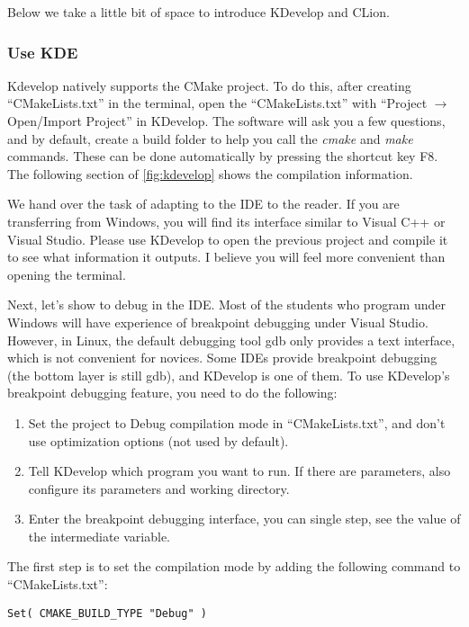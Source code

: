 Below we take a little bit of space to introduce KDevelop and CLion.

\subsubsection{Use KDE}
Kdevelop natively supports the CMake project. To do this, after creating ``CMakeLists.txt'' in the terminal, open the ``CMakeLists.txt'' with ``Project $\rightarrow$Open/Import Project'' in KDevelop. The software will ask you a few questions, and by default, create a build folder to help you call the \textit{cmake} and \textit{make} commands. These can be done automatically by pressing the shortcut key F8. The following section of \autoref{fig:kdevelop} shows the compilation information.

We hand over the task of adapting to the IDE to the reader. If you are transferring from Windows, you will find its interface similar to Visual C++ or Visual Studio. Please use KDevelop to open the previous project and compile it to see what information it outputs. I believe you will feel more convenient than opening the terminal.

Next, let's show to debug in the IDE. Most of the students who program under Windows will have experience of breakpoint debugging under Visual Studio. However, in Linux, the default debugging tool gdb only provides a text interface, which is not convenient for novices. Some IDEs provide breakpoint debugging (the bottom layer is still gdb), and KDevelop is one of them. To use KDevelop's breakpoint debugging feature, you need to do the following:

\begin{enumerate}
    \item Set the project to Debug compilation mode in ``CMakeLists.txt'', and don't use optimization options (not used by default).
    \item Tell KDevelop which program you want to run. If there are parameters, also configure its parameters and working directory.
    \item Enter the breakpoint debugging interface, you can single step, see the value of the intermediate variable.
\end{enumerate}


The first step is to set the compilation mode by adding the following command to ``CMakeLists.txt'':
\begin{lstlisting}[caption=slambook2/ch2/CMakeLists.txt]
Set( CMAKE_BUILD_TYPE "Debug" )
\end{lstlisting}

